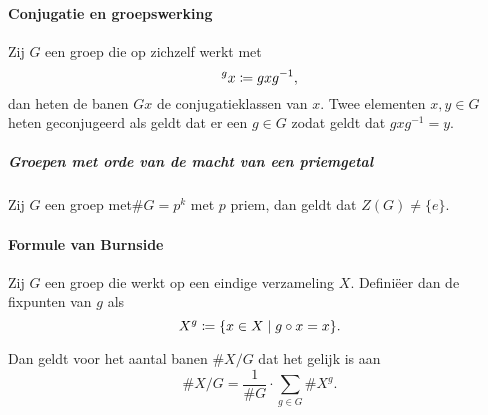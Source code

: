 \paragraph{Conjugatie en groepswerking} Zij \(G\) een groep die op zichzelf werkt met
\[
    ^{g}x\coloneqq gxg^{-1},
\]
dan heten de banen \(Gx\) de conjugatieklassen van \(x\). Twee elementen \(x,y\in G\) heten geconjugeerd als geldt dat er een \(g\in G\) zodat geldt dat \(gxg^{-1}=y\).

\subparagraph{Groepen met orde van de macht van een priemgetal} Zij \(G\) een groep met\(\#G=p^{k}\) met \(p\) priem, dan geldt dat \(Z(G)\neq \{e\}\).

\paragraph{Formule van Burnside} Zij \(G\) een groep die werkt op een eindige verzameling \(X\). Definiëer dan de fixpunten van \(g\) als
\[
    X^{g}\coloneqq\{x\in X\mid g\circ x=x\}.
\]

Dan geldt voor het aantal banen \(\#X/G\) dat het gelijk is aan
\[
    \#X/G=\frac{1}{\#G}\cdot\sum_{g\in G}\#X^{g}.
\]